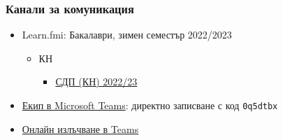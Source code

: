 \documentclass{beamer}
\begin{document}
\begin{frame}
  \frametitle{Канали за комуникация}
  \begin{itemize}
  \item Learn.fmi: Бакалаври, зимен семестър 2022/2023
    \begin{itemize}
    \item КН
      \begin{itemize}
      \item \href{https://learn.fmi.uni-sofia.bg/course/view.php?id=8509}{СДП (КН) 2022/23}
      \end{itemize}
    \end{itemize}
  \item \href{https://teams.microsoft.com/l/team/19\%3aUZEWpZa64z9Ns2tWRqscadTdQgtEunExCO5p-zOo1Lg1\%40thread.tacv2/conversations?groupId=01c838dc-0d43-4b32-a71a-e209f21f0551&tenantId=9d05c5fb-e448-4700-8a58-e15b93c84ea9}{Екип в Microsoft Teams}: директно записване с код \tt{0q5dtbx}
  \item \href{https://teams.microsoft.com/l/meetup-join/19\%3a07f7f2f74bdf434cbcaefdca4d10427a\%40thread.tacv2/1664915548412?context=\%7b\%22Tid\%22\%3a\%229d05c5fb-e448-4700-8a58-e15b93c84ea9\%22\%2c\%22Oid\%22\%3a\%227354cd98-c695-434c-afd6-2d519f48fa53\%22\%7d}{Онлайн излъчване в Teams}
  \end{itemize}
\end{frame}
\end{document}
